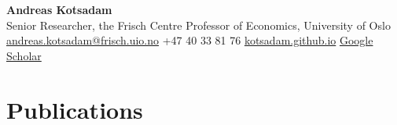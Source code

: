 \documentclass[11pt]{article}
\begin{document}
{\Huge\bfseries\color{accent} Andreas Kotsadam}\\[3pt]
{\large Senior Researcher, the Frisch Centre \quad\textbullet\quad Professor of Economics, University of Oslo}\\[5pt]
{\small
\href{mailto:andreas.kotsadam@frisch.uio.no}{andreas.kotsadam@frisch.uio.no}
\;\textbullet\; +47 40 33 81 76
\;\textbullet\; \href{https://kotsadam.github.io/}{kotsadam.github.io}
\;\textbullet\; \href{https://scholar.google.com/citations?user=TPk54IoAAAAJ}{Google Scholar}
}

\vspace{0.4em}

\section{Publications}
\end{document}
